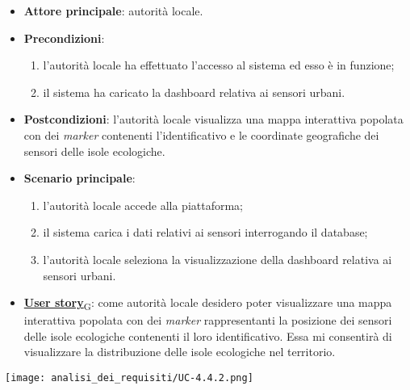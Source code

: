 \begin{itemize}
	\item \textbf{Attore principale}: autorità locale.
	\item \textbf{Precondizioni}:
	      \begin{enumerate}
		      \item l'autorità locale ha effettuato l'accesso al sistema ed esso è in funzione;
		      \item il sistema ha caricato la dashboard relativa ai sensori urbani.
	      \end{enumerate}
	\item \textbf{Postcondizioni}: l'autorità locale visualizza una mappa interattiva popolata con dei \textit{marker} contenenti l'identificativo e le coordinate geografiche dei sensori delle isole ecologiche.
	\item \textbf{Scenario principale}:
	      \begin{enumerate}
		      \item l'autorità locale accede alla piattaforma;
		      \item il sistema carica i dati relativi ai sensori interrogando il database;
		      \item l'autorità locale seleziona la visualizzazione della dashboard relativa ai sensori urbani.
	      \end{enumerate}
	\item \href{https://7last.github.io/docs/pb/documentazione-interna/glossario\#user-story}{\textbf{User story}\textsubscript{G}}:
	      come autorità locale desidero poter visualizzare una mappa interattiva popolata con dei \textit{marker} rappresentanti la posizione dei sensori delle isole ecologiche
	      contenenti il loro identificativo. Essa mi consentirà di visualizzare la distribuzione delle isole ecologiche nel territorio.
\end{itemize}
\begin{center}
	\texttt{[image: analisi\_dei\_requisiti/UC-4.4.2.png]}
\end{center}


